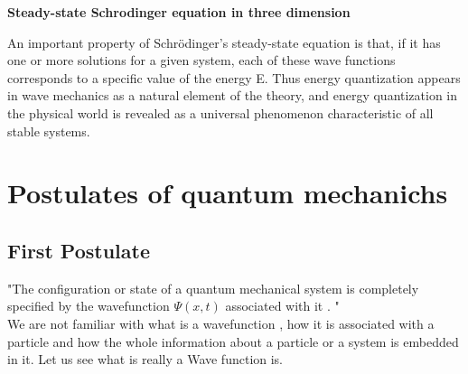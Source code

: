 \textbf{Steady-state Schrodinger equation in three dimension}  \\
\begin{center}
\end{center}
An important property of Schrödinger's steady-state equation is that, if it has one or more solutions for a given system, each of these wave functions corresponds to a specific value of the energy E. Thus energy quantization appears in wave mechanics as a natural element of the theory, and energy quantization in the physical world is revealed as a universal phenomenon characteristic of all stable systems.
\section{Postulates of quantum mechanichs}
\subsection{First Postulate}
"The configuration or state of a quantum mechanical system is completely specified by  the wavefunction  ${\Psi(x,t)}$ associated with it . "
\newline
\\We are not familiar with what is a wavefunction , how it is associated with a particle and how the whole information about a particle or a system is embedded in it. Let us see what is really a Wave function is.

